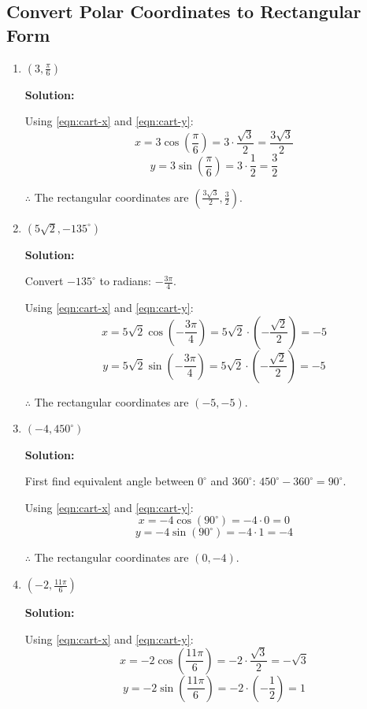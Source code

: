 \documentclass[a4paper]{article}
\begin{document}
\subsection*{Convert Polar Coordinates to Rectangular Form}

\begin{enumerate}
    \item \(\left( 3, \frac{\pi}{6} \right)\)
    
    \textbf{Solution:}
    
    Using \cref{eqn:cart-x} and \cref{eqn:cart-y}:
    \[
    x = 3\cos\left(\frac{\pi}{6}\right) = 3 \cdot \frac{\sqrt{3}}{2} = \frac{3\sqrt{3}}{2}
    \]
    \[
    y = 3\sin\left(\frac{\pi}{6}\right) = 3 \cdot \frac{1}{2} = \frac{3}{2}
    \]
    
    \(\therefore\) The rectangular coordinates are \(\left( \frac{3\sqrt{3}}{2}, \frac{3}{2} \right)\).
    
    \item \(\left( 5\sqrt{2}, -135^\circ \right)\)
    
    \textbf{Solution:}
    
    Convert \(-135^\circ\) to radians: \(-\frac{3\pi}{4}\).
    
    Using \cref{eqn:cart-x} and \cref{eqn:cart-y}:
    \[
    x = 5\sqrt{2}\cos\left(-\frac{3\pi}{4}\right) = 5\sqrt{2} \cdot \left(-\frac{\sqrt{2}}{2}\right) = -5
    \]
    \[
    y = 5\sqrt{2}\sin\left(-\frac{3\pi}{4}\right) = 5\sqrt{2} \cdot \left(-\frac{\sqrt{2}}{2}\right) = -5
    \]
    
    \(\therefore\) The rectangular coordinates are \((-5, -5)\).
    
    \item \((-4, 450^\circ)\)
    
    \textbf{Solution:}
    
    First find equivalent angle between \(0^\circ\) and \(360^\circ\):
    \(450^\circ - 360^\circ = 90^\circ\).
    
    Using \cref{eqn:cart-x} and \cref{eqn:cart-y}:
    \[
    x = -4\cos(90^\circ) = -4 \cdot 0 = 0
    \]
    \[
    y = -4\sin(90^\circ) = -4 \cdot 1 = -4
    \]
    
    \(\therefore\) The rectangular coordinates are \((0, -4)\).
    
    \item \(\left( -2, \frac{11\pi}{6} \right)\)
    
    \textbf{Solution:}
    
    Using \cref{eqn:cart-x} and \cref{eqn:cart-y}:
    \[
    x = -2\cos\left(\frac{11\pi}{6}\right) = -2 \cdot \frac{\sqrt{3}}{2} = -\sqrt{3}
    \]
    \[
    y = -2\sin\left(\frac{11\pi}{6}\right) = -2 \cdot \left(-\frac{1}{2}\right) = 1
    \]
    

\end{enumerate}
\end{document}
